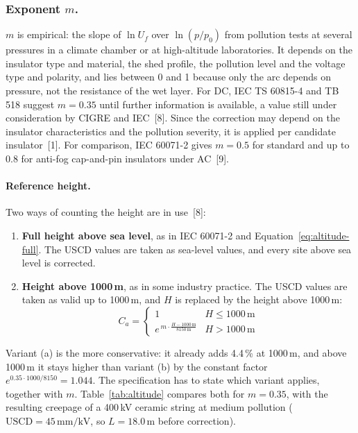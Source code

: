 \subsubsection{Exponent $m$.}
$m$ is empirical: the slope of $\ln U_{f}$ over $\ln (p/p_{0})$ from
pollution tests at several pressures in a climate chamber or at high-altitude
laboratories. It depends on the insulator type and material, the shed
profile, the pollution level and the voltage type and polarity, and lies
between 0 and 1 because only the arc depends on pressure, not the resistance
of the wet layer. For DC, IEC TS 60815-4 and TB 518 suggest $m = 0.35$ until
further information is available, a value still under consideration by
CIGRE and IEC~[8]. Since the correction may depend on the insulator
characteristics and the pollution severity, it is applied per candidate
insulator~[1]. For comparison, IEC 60071-2 gives $m = 0.5$ for standard and
up to 0.8 for anti-fog cap-and-pin insulators under AC~[9].


\paragraph{Reference height.}
Two ways of counting the height are in use~[8]:

\begin{enumerate}[label=(\alph*), itemsep=0.2em]
  \item \textbf{Full height above sea level}, as in IEC 60071-2 and
        Equation~\eqref{eq:altitude-full}. The USCD values are taken as
        sea-level values, and every site above sea level is corrected.
  \item \textbf{Height above 1000\,m}, as in some industry practice. The USCD
        values are taken as valid up to 1000\,m, and $H$ is replaced by the
        height above 1000\,m:
        \begin{equation}
          C_{a} =
          \begin{cases}
            1 & H \le 1000\,\mathrm{m}\\[0.3em]
            e^{\,m \cdot \frac{H - 1000\,\mathrm{m}}{8150\,\mathrm{m}}} & H > 1000\,\mathrm{m}
          \end{cases}
          \label{eq:altitude-1000}
        \end{equation}
\end{enumerate}

Variant (a) is the more conservative: it already adds 4.4\,\% at 1000\,m, and
above 1000\,m it stays higher than variant (b) by the constant factor
$e^{0.35 \cdot 1000/8150} = 1.044$. The specification has to state which
variant applies, together with $m$. Table~\ref{tab:altitude} compares both
for $m = 0.35$, with the resulting creepage of a 400\,kV ceramic string at
medium pollution ($\mathrm{USCD} = 45\,\mathrm{mm/kV}$, so
$L = 18.0\,\mathrm{m}$ before correction).

